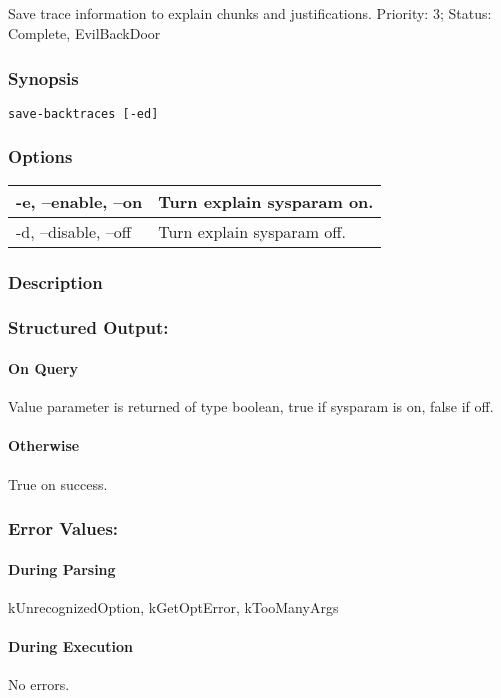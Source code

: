 \subsection{}
\label{save-backtraces}
Save trace information to explain chunks and justifications. 
 Priority: 3; Status: Complete, EvilBackDoor
\subsubsection*{Synopsis}
\begin{verbatim}
save-backtraces [-ed]
\end{verbatim}
\subsubsection*{Options}
\begin{tabular}{|l|l|}
\hline 
 -e, --enable, --on  & Turn explain sysparam on.  \\
 \hline 
 -d, --disable, --off  & Turn explain sysparam off.  \\
 \hline 
\end{tabular}
\subsubsection*{Description}
\subsubsection*{Structured Output:}
\paragraph*{On Query}
 Value parameter is returned of type boolean, true if sysparam is on, false if off. 
\paragraph*{Otherwise}
 True on success. 
\subsubsection*{Error Values:}
\paragraph*{During Parsing}
 kUnrecognizedOption, kGetOptError, kTooManyArgs
\paragraph*{During Execution}
 No errors. 
